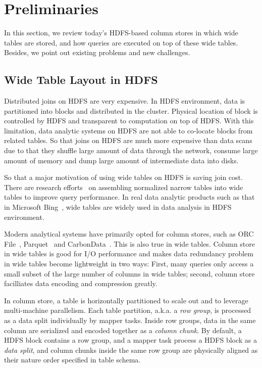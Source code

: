 \section{Preliminaries}

In this section, we review today's HDFS-based column stores in which wide tables are stored, and how queries are executed on top of these wide tables. Besides, we point out existing problems and new  challenges.

\subsection{Wide Table Layout in HDFS}

Distributed joins on HDFS are very expensive.
In HDFS environment, data is partitioned into blocks and distributed in the cluster. 
Physical location of block is controlled by HDFS and transparent to computation on top of HDFS.
With this limitation, data analytic systems on HDFS are not able to co-locate blocks from related tables.
So that joins on HDFS are much more expensive than data scans due to that they shuffle large amount of data through the network, consume large amount of memory and dump large amount of intermediate data into disks.

So that a major motivation of using wide tables on HDFS is saving join cost.
There are research efforts~\cite{WideTable:paper} on assembling normalized narrow tables into wide tables to improve query performance.
In real data analytic products such as that in Microsoft Bing~\cite{ColumnOrdering}, wide tables are widely used in data analysis in HDFS environment.

Modern analytical systems have primarily opted for column stores, such as ORC File~\cite{ORCMainPage}, Parquet~\cite{parquetMainPage} and CarbonData~\cite{CarbonDataMainPage}.
This is also true in wide tables.
Column store in wide tables is good for I/O performance and makes data redundancy problem in wide tables become lightweight in two ways: First, many queries only access a small subset of the large number of columns in wide tables; second, column store facilliates data encoding and compression greatly.

In column store, a table is horizontally partitioned to scale out and to leverage multi-machine parallelism.
Each table partition, a.k.a. a \textit{row group}, is processed as a data split individually by mapper tasks.
Inside row groups, data in the same column are serialized and encoded together as a \textit{column chunk}.
By default, a HDFS block contains a row group, and a mapper task process a HDFS block as a \textit{data split}, and column chunks inside the same row group are physically aligned as their nature order specified in table schema.

